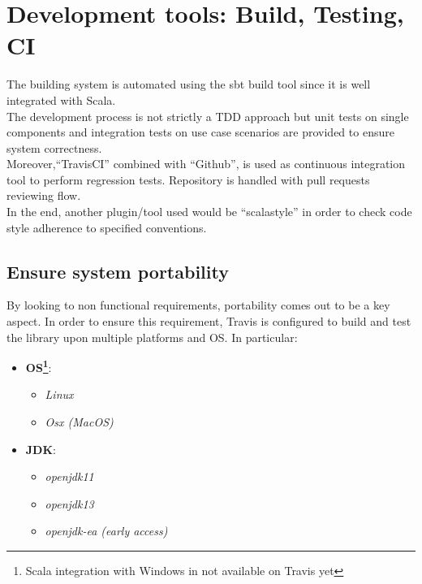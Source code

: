 \section{Development tools: Build, Testing, CI}

The building system is automated using the sbt build tool since it is well integrated with Scala.
\\
The development process is not strictly a TDD approach but unit tests on single components and integration tests on use case scenarios are provided to ensure system correctness.  
\\
Moreover,``TravisCI'' combined with ``Github'', is used as continuous integration tool to perform regression tests. Repository is handled with pull requests reviewing flow.
\\
In the end, another plugin/tool used would be ``scalastyle'' in order to check code style adherence to specified conventions.

\subsection{Ensure system portability}

By looking to non functional requirements, portability comes out to be a key aspect. In order to ensure this requirement, Travis is configured to build and test the library upon multiple platforms and OS. In particular:
\begin{itemize}
\item \textbf{OS\footnote{Scala integration with Windows in not available on Travis yet}}: 
  \begin{itemize}
  \item \textit{Linux}
  \item \textit{Osx (MacOS)}
  \end{itemize}
\item \textbf{JDK}:
  \begin{itemize}
  \item \textit{openjdk11}
  \item \textit{openjdk13}
  \item \textit{openjdk-ea (early access)}
  \end{itemize} 
\end{itemize}  











 